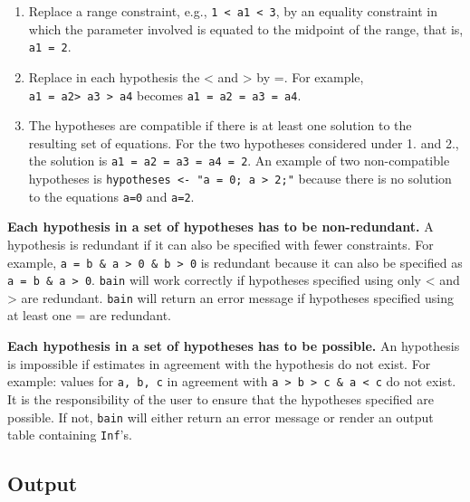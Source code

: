 \documentclass[
]{book}
\providecommand{\tightlist}{%
  \setlength{\itemsep}{0pt}\setlength{\parskip}{0pt}}
\begin{document}
\begin{enumerate}
\def\labelenumi{\arabic{enumi})}
\tightlist
\item
  Replace a range constraint, e.g., \texttt{1\ \textless{}\ a1\ \textless{}\ 3}, by an equality
  constraint in which the parameter involved is equated to the midpoint of the
  range, that is, \texttt{a1\ =\ 2}.
\item
  Replace in each hypothesis the \textless{} and \textgreater{} by =. For example,
  \texttt{a1\ =\ a2\textgreater{}\ a3\ \textgreater{}\ a4} becomes \texttt{a1\ =\ a2\ =\ a3\ =\ a4}.
\item
  The hypotheses are compatible if there is at least one solution to the
  resulting set of equations. For the two hypotheses considered under 1. and
  2., the solution is \texttt{a1\ =\ a2\ =\ a3\ =\ a4\ =\ 2}. An example of two non-compatible
  hypotheses is \texttt{hypotheses\ \textless{}-\ "a\ =\ 0;\ a\ \textgreater{}\ 2;"} because there is no
  solution to the equations \texttt{a=0} and \texttt{a=2}.
\end{enumerate}

\textbf{Each hypothesis in a set of hypotheses has to be non-redundant.} A
hypothesis is redundant if it can also be specified with fewer constraints.
For example, \texttt{a\ =\ b\ \&\ a\ \textgreater{}\ 0\ \&\ b\ \textgreater{}\ 0} is redundant because it can also be
specified as \texttt{a\ =\ b\ \&\ a\ \textgreater{}\ 0}. \texttt{bain} will work correctly if
hypotheses specified using only \textless{} and \textgreater{} are redundant. \texttt{bain} will
return an error message if hypotheses specified using at least one = are
redundant.

\textbf{Each hypothesis in a set of hypotheses has to be possible.} An
hypothesis is impossible if estimates in agreement with the hypothesis do not
exist. For example: values for \texttt{a,\ b,\ c} in agreement with \texttt{a\ \textgreater{}\ b\ \textgreater{}\ c\ \&\ a\ \textless{}\ c} do not exist. It is the responsibility of the user to ensure that the
hypotheses specified are possible. If not, \texttt{bain} will either return an
error message or render an output table containing \texttt{Inf}'s.

\hypertarget{output}{%
\subsection{Output}\label{output}}
\end{document}
